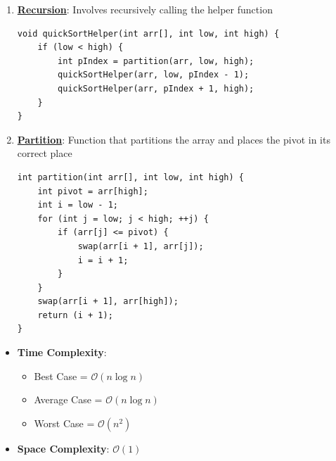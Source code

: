 \documentclass[a4paper, 12pt]{book}
\newcommand{\BigO}[1]{\mathcal{O}\left(#1\right)}
\begin{document}
	
	\begin{enumerate}
		\item \textbf{\underline{Recursion}}: Involves recursively calling the helper function
	
	\begin{tcolorbox}
	\begin{Verbatim}
void quickSortHelper(int arr[], int low, int high) {
	if (low < high) {
		int pIndex = partition(arr, low, high);
		quickSortHelper(arr, low, pIndex - 1);
		quickSortHelper(arr, pIndex + 1, high);
	}
}
	\end{Verbatim}
	\end{tcolorbox}
	
	\vspace{\baselineskip} 
	
	\item \textbf{\underline{Partition}}: Function that partitions the array and places the pivot in its correct place
	\begin{tcolorbox}
		\begin{Verbatim}
int partition(int arr[], int low, int high) {
	int pivot = arr[high];
	int i = low - 1;
	for (int j = low; j < high; ++j) {
		if (arr[j] <= pivot) {
			swap(arr[i + 1], arr[j]);
			i = i + 1;
		}
	}
	swap(arr[i + 1], arr[high]);
	return (i + 1);
}
		\end{Verbatim}
	\end{tcolorbox}
	\vspace{\baselineskip} 
\end{enumerate}


\begin{itemize}
	\item \textbf{Time Complexity}:
	\begin{itemize}
	
		\item Best Case = $\BigO{n \log n}$ 
		
		\item Average Case = $\BigO{n \log n}$ 
		
		\item Worst Case = $\BigO{n^2}$
	\end{itemize}
		
	\item \textbf{Space Complexity}: $\BigO{1}$ 
\end{itemize}
	
\end{document}
